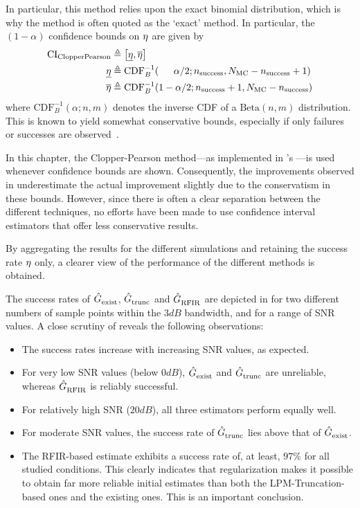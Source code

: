 In particular, this method relies upon the exact binomial distribution, which is why the method is often quoted as the `exact' method.
In particular, the $(1-\alpha)$  confidence bounds on $\eta$ are given by~\citep{Clopper1934}
\begin{align}\label{eq:initvals:Binomial:CI}
 \mathrm{CI}_{\mathrm{ClopperPearson}}  & \triangleq \left[ \underline{\eta}, \overline{\eta} \right]\\
 \underline{\eta} &\triangleq 
  \mathrm{CDF}_B^{-1}(\phantom{1-\;}\alpha/2; n_{\mathrm{success}}, N_{\mathrm{MC}} - n_{\mathrm{success}} + 1)\\
  \overline{\eta} &\triangleq
  \mathrm{CDF}_B^{-1}(1-\alpha/2; n_{\mathrm{success}} + 1, N_{\mathrm{MC}} - n_{\mathrm{success}})
\end{align}
where $\mathrm{CDF}_B^{-1}(\alpha; n,m)$ denotes the inverse \gls{CDF} of a $\mathrm{Beta}(n,m)$ distribution. %
This is known to yield somewhat conservative bounds, especially if only failures or successes are observed~\citep{Ross2003}.

In this chapter, the Clopper-Pearson method---as implemented in \MATLAB's ---is used whenever confidence bounds are shown.
Consequently, the improvements observed in  underestimate the actual improvement slightly due to the conservatism in these bounds.
However, since there is often a clear separation between the different techniques, no efforts have been made to use confidence interval estimators that offer less conservative results.

By aggregating the results for the different simulations and retaining the success rate $\eta$ only, a clearer view of the performance of the different methods is obtained.

The success rates of $\hat{G}_{\mathrm{exist}}^{\mathrm{}}$, $\hat{G}_{\mathrm{trunc}}^{\mathrm{}}$ and $\hat{G}_{\mathrm{RFIR}}^{\mathrm{}}$ are depicted in   for two different numbers of sample points within the $3\unit{dB}$ bandwidth, and for a range of SNR values. A close scrutiny of   reveals the following observations: \begin{itemize}
\item The success rates increase with increasing SNR values, as expected.
\item For very low SNR values (below $0\unit{dB}$), $\hat{G}_{\mathrm{exist}}^{\mathrm{}}$ and $\hat{G}_{\mathrm{trunc}}^{\mathrm{}}$ are unreliable, whereas $\hat{G}_{\mathrm{RFIR}}^{\mathrm{}}$ is reliably successful. 
\item For relatively high SNR ($20\unit{dB}$), all three estimators perform equally well.
\item For moderate SNR values, the success rate of $\hat{G}_{\mathrm{trunc}}^{\mathrm{}}$ lies above that of $\hat{G}_{\mathrm{exist}}^{\mathrm{}}$.
\item The RFIR-based estimate exhibits a success rate of, at least, $97\%$ for all studied conditions. 
This clearly indicates that regularization makes it possible to obtain far more reliable initial estimates than both the LPM-Truncation-based ones and the existing ones. 
This is an important conclusion.
\end{itemize}

